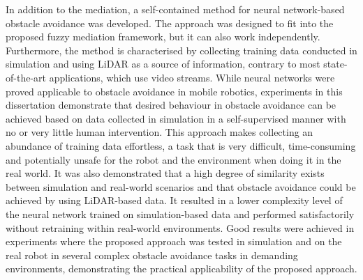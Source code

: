 In addition to the mediation, a self-contained method for neural network-based obstacle avoidance was developed. The approach was designed to fit into the proposed fuzzy mediation framework, but it can also work independently. Furthermore, the method is characterised by collecting training data conducted in simulation and using LiDAR as a source of information, contrary to most state-of-the-art applications, which use video streams. While neural networks were proved applicable to obstacle avoidance in mobile robotics, experiments in this dissertation demonstrate that desired behaviour in obstacle avoidance can be achieved based on data collected in simulation in a self-supervised manner with no or very little human intervention. This approach makes collecting an abundance of training data effortless, a task that is very difficult, time-consuming and potentially unsafe for the robot and the environment when doing it in the real world. It was also demonstrated that a high degree of similarity exists between simulation and real-world scenarios and that obstacle avoidance could be achieved by using LiDAR-based data. It resulted in a lower complexity level of the neural network trained on simulation-based data and performed satisfactorily without retraining within real-world environments. Good results were achieved in experiments where the proposed approach was tested in simulation and on the real robot in several complex obstacle avoidance tasks in demanding environments, demonstrating the practical applicability of the proposed approach.

